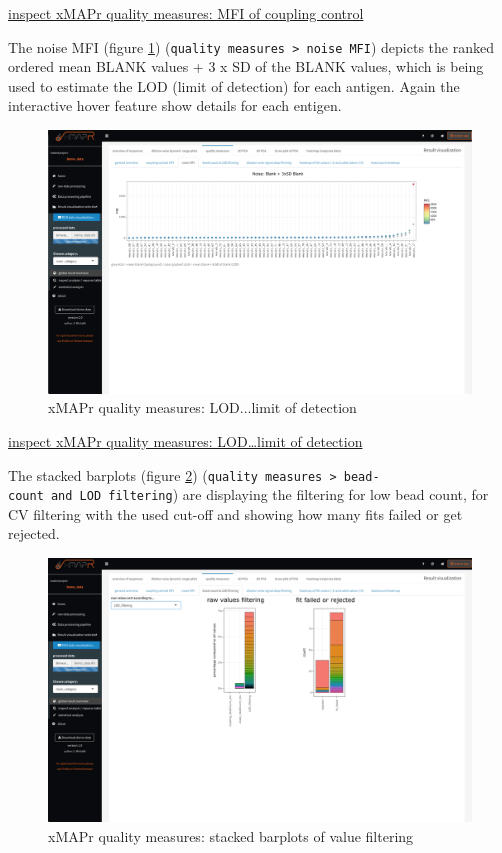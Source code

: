 \documentclass[]{book}
\theoremstyle{definition}
\theoremstyle{definition}
\theoremstyle{definition}
\theoremstyle{remark}
\begin{document}
\href{figures/quality_measures__coupling_control_MFI.png}{inspect xMAPr
quality measures: MFI of coupling control}

The noise MFI (figure \ref{fig:LOD})
(\texttt{quality\ measures\ \textgreater{}\ noise\ MFI}) depicts the
ranked ordered mean BLANK values + 3 x SD of the BLANK values, which is
being used to estimate the LOD (limit of detection) for each antigen.
Again the interactive hover feature show details for each entigen.

\begin{figure}
\includegraphics[width=50.53in]{figures/quality_measures__LOD} \caption{xMAPr quality measures: LOD...limit of detection}\label{fig:LOD}
\end{figure}

\href{figures/quality_measures__LOD.png}{inspect xMAPr quality measures:
LOD\ldots{}limit of detection}

The stacked barplots (figure \ref{fig:BarplotsValueFiltering})
(\texttt{quality\ measures\ \textgreater{}\ bead-count\ and\ LOD\ filtering})
are displaying the filtering for low bead count, for CV filtering with
the used cut-off and showing how many fits failed or get rejected.

\begin{figure}
\includegraphics[width=50.47in]{figures/quality_measures__value_filtering} \caption{xMAPr quality measures: stacked barplots of value filtering}\label{fig:BarplotsValueFiltering}
\end{figure}
\end{document}
